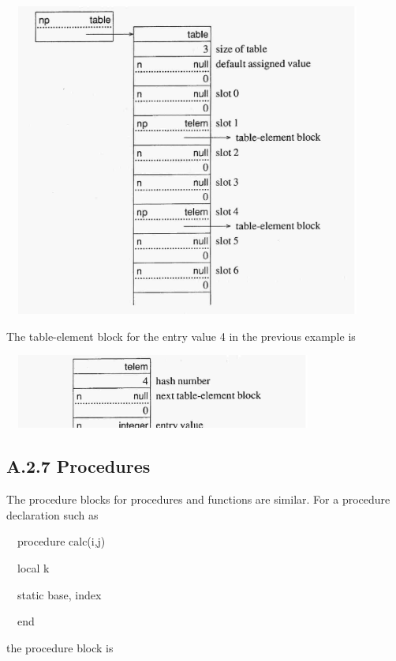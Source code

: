 \ \  \includegraphics[width=4.489in,height=4.0516in]{ib-img/ib-img121.jpg} 


The table-element block for the entry value 4 in the previous example is


\ \  \includegraphics[width=3.848in,height=0.961in]{ib-img/ib-img122.jpg} 

\subsection[A.2.7 Procedures]{A.2.7 Procedures}

The procedure blocks for procedures and functions are similar. For a
procedure declaration such as

{\ttfamily\mdseries
\ \ procedure calc(i,j)}

{\ttfamily\mdseries
\ \ local k}

{\ttfamily\mdseries
\ \ static base, index}

{\ttfamily\mdseries
\ \ end}

\noindent the procedure block is


